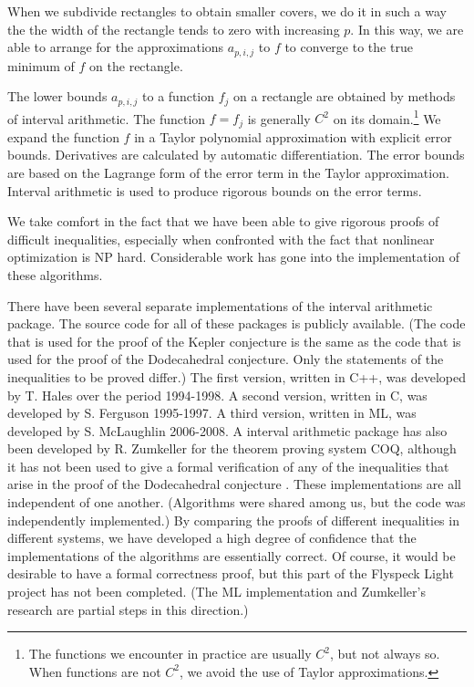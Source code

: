 When we subdivide rectangles to obtain smaller covers, we do
it in such a way the the width of the rectangle tends to zero
with increasing $p$.
In this way, we are able to arrange for the approximations
$a_{p,i,j}$ to $f$ to converge to the true minimum of $f$ on the
rectangle.

The lower bounds $a_{p,i,j}$ to a function $f_j$ on a rectangle
are obtained by methods of interval arithmetic.  The function
$f=f_j$ is generally $C^2$ on its domain.\footnote{The functions
we encounter in practice are usually $C^2$, but not always so.  When functions are not
$C^2$, we avoid the use of Taylor approximations.}  We expand
the function $f$ in a Taylor polynomial approximation with
explicit error bounds.  Derivatives are calculated by automatic
differentiation.  The error bounds are based on the Lagrange form of
the error term in the Taylor approximation.  Interval arithmetic is used to produce rigorous bounds on the error terms.

We take comfort in the fact that we have
been able to give rigorous proofs of difficult inequalities,
especially when confronted with the fact that 
nonlinear optimization is NP hard.  Considerable work has gone
into the implementation of these algorithms.

There have been several separate implementations of the interval
arithmetic package.  
The source code for all of these packages
is publicly available. (The code that is used for the proof of 
the Kepler conjecture is the same as the code that is used for
the proof of the Dodecahedral conjecture.  Only the statements
of the inequalities to be proved differ.) 
The first version, written in C++, 
was developed by T. Hales
over the period 1994-1998.  
A second version, written in C, was developed by S. Ferguson 
1995-1997.  A third version, written in ML, was developed by S. McLaughlin 2006-2008.  A interval arithmetic package has also been developed
by R. Zumkeller for the theorem proving system COQ, although it has not  been used to give a formal verification of any of the inequalities that arise in the proof of the Dodecahedral conjecture \cite{Zu}.
These implementations are all independent of one another. (Algorithms
were shared among us, but the code was independently implemented.) 
By comparing the proofs of different inequalities in different 
systems, we have developed 
a high degree of confidence that the implementations
of the algorithms are essentially correct.  Of course, it would
be desirable to have a formal correctness proof, but this part
of the Flyspeck Light project has not been completed.  (The ML
implementation and Zumkeller's research are partial steps
in this direction.)

